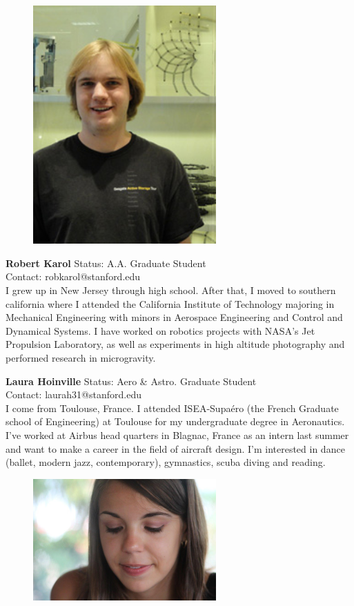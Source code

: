 \begin{figure}[h]
  \centering
     \includegraphics[width=7cm]{images/robert_karol.jpg}
  \label{fig:11}
\end{figure}

\textbf{Robert Karol}
Status: A.A. Graduate Student \\
Contact: robkarol@stanford.edu \\
I grew up in New Jersey through high school. After that, I moved to southern california where I attended the California Institute of Technology majoring in Mechanical Engineering with minors in Aerospace Engineering and Control and Dynamical Systems. I have worked on robotics projects with NASA's Jet Propulsion Laboratory, as well as experiments in high altitude photography and performed research in microgravity.

\textbf{Laura Hoinville}
Status: Aero & Astro. Graduate Student\\
Contact: laurah31@stanford.edu\\
I come from Toulouse, France. I attended ISEA-Supaéro (the French Graduate school of Engineering) at Toulouse for my undergraduate degree in Aeronautics. I’ve worked at Airbus head quarters in Blagnac, France as an intern last summer and want to make a career in the field of aircraft design. I’m interested in dance (ballet, modern jazz, contemporary), gymnastics, scuba diving and reading.

\begin{figure}[h]
\centering
\includegraphics[width=7cm]{images/image012bis}
\label{fig:12bis}
\end{figure}

